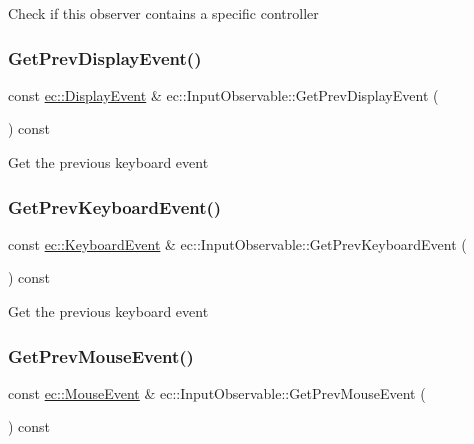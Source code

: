 Check if this observer contains a specific controller \mbox{\label{classec_1_1_input_observable_af18dbc3d7fe632683176b751d901f5d3}} 
\subsubsection{\texorpdfstring{Get\+Prev\+Display\+Event()}{GetPrevDisplayEvent()}}
{\footnotesize\ttfamily const \mbox{\hyperlink{structec_1_1_display_event}{ec\+::\+Display\+Event}} \& ec\+::\+Input\+Observable\+::\+Get\+Prev\+Display\+Event (\begin{DoxyParamCaption}{ }\end{DoxyParamCaption}) const}

Get the previous keyboard event \mbox{\label{classec_1_1_input_observable_a25274eaa64334ec3d0c00dfb55f794c2}} 
\subsubsection{\texorpdfstring{Get\+Prev\+Keyboard\+Event()}{GetPrevKeyboardEvent()}}
{\footnotesize\ttfamily const \mbox{\hyperlink{structec_1_1_keyboard_event}{ec\+::\+Keyboard\+Event}} \& ec\+::\+Input\+Observable\+::\+Get\+Prev\+Keyboard\+Event (\begin{DoxyParamCaption}{ }\end{DoxyParamCaption}) const}

Get the previous keyboard event \mbox{\label{classec_1_1_input_observable_a6eb1660661290184fc1fe522f6b6651e}} 
\subsubsection{\texorpdfstring{Get\+Prev\+Mouse\+Event()}{GetPrevMouseEvent()}}
{\footnotesize\ttfamily const \mbox{\hyperlink{structec_1_1_mouse_event}{ec\+::\+Mouse\+Event}} \& ec\+::\+Input\+Observable\+::\+Get\+Prev\+Mouse\+Event (\begin{DoxyParamCaption}{ }\end{DoxyParamCaption}) const}

